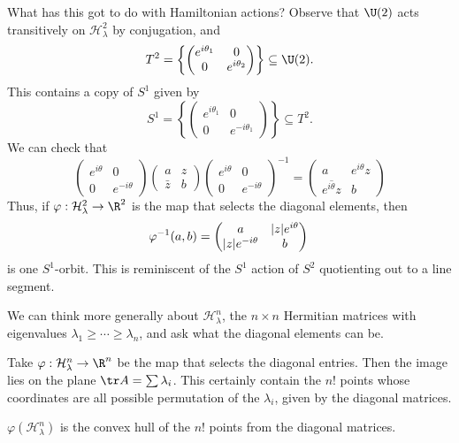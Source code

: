 \documentclass[a4paper]{article}
\begin{document}
What has this got to do with Hamiltonian actions? Observe that $\U(2)$ acts transitively on $\mathcal{H}_\lambda^2$ by conjugation, and
\[
  T^2 = \left\{
    \begin{pmatrix}
      e^{i\theta_1} & 0\\
      0 & e^{i\theta_2}
  \end{pmatrix}\right\} \subseteq \U(2).
\]
This contains a copy of $S^1$ given by
\[
  S^1 = \left\{
    \begin{pmatrix}
      e^{i\theta_1} & 0\\
      0 & e^{-i\theta_1}
  \end{pmatrix}\right\} \subseteq T^2.
\]
We can check that
\[
  \begin{pmatrix}
    e^{i\theta} & 0\\
    0 & e^{-i\theta}
  \end{pmatrix}
  \begin{pmatrix}
    a & z\\
    \bar{z} & b
  \end{pmatrix}
  \begin{pmatrix}
    e^{i\theta} & 0\\
    0 & e^{-i\theta}
  \end{pmatrix}^{-1} =
  \begin{pmatrix}
    a & e^{i\theta}z\\
    \overline{e^{i\theta} z} & b
  \end{pmatrix}
\]
Thus, if $\varphi: \mathcal{H}_\lambda^2 \to \R^2$ is the map that selects the diagonal elements, then
\[
  \varphi^{-1}(a, b) =
  \begin{pmatrix}
    a & |z|e^{i\theta}\\
    |z|e^{-i\theta} & b
  \end{pmatrix}\\
\]
is one $S^1$-orbit. This is reminiscent of the $S^1$ action of $S^2$ quotienting out to a line segment.

We can think more generally about $\mathcal{H}_\lambda^n$, the $n\times n$ Hermitian matrices with eigenvalues $\lambda_1 \geq \cdots \geq \lambda_n$, and ask what the diagonal elements can be.

Take $\varphi: \mathcal{H}_\lambda^n \to \R^n$ be the map that selects the diagonal entries. Then the image lies on the plane $\tr A = \sum \lambda_i$. This certainly contain the $n!$ points whose coordinates are all possible permutation of the $\lambda_i$, given by the diagonal matrices.

\begin{thm}
  $\varphi(\mathcal{H}_\lambda^n)$ is the convex hull of the $n!$ points from the diagonal matrices.
\end{thm}
\end{document}
